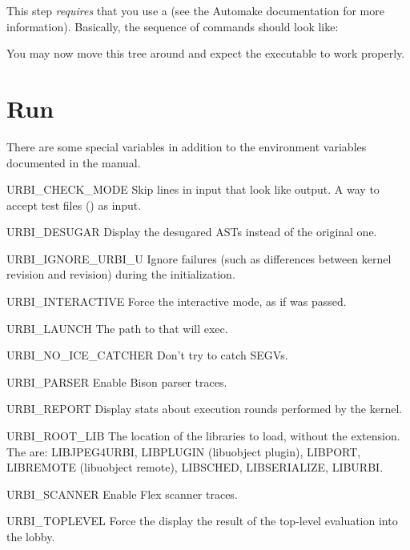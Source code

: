 This step \emph{requires} that you use a  (see the Automake
documentation for more information).  Basically, the sequence of commands
should look like:


You may now move this tree around and expect the executable to work
properly.

\section{Run}

There are some special variables in addition to the environment
variables documented in the manual.

\begin{envs}
\item[URBI\_CHECK\_MODE] Skip lines in input that look like \urbi output.  A
  way to accept test files () as input.

\item[URBI\_DESUGAR] Display the desugared ASTs instead of the
  original one.

\item[URBI\_IGNORE\_URBI\_U] Ignore failures (such as differences between
  kernel revision and  revision) during the initialization.

\item[URBI\_INTERACTIVE] Force the interactive mode, as if
   was passed.

\item[URBI\_LAUNCH] The path to  that
   will exec.

\item[URBI\_NO\_ICE\_CATCHER] Don't try to catch SEGVs.

\item[URBI\_PARSER] Enable Bison parser traces.

\item[URBI\_REPORT] Display stats about execution rounds performed by
  the kernel.

\item[URBI\_ROOT\_LIB\var{name}] The location of the libraries to load,
  without the extension.  The  are: LIBJPEG4URBI,
  LIBPLUGIN (libuobject plugin), LIBPORT, LIBREMOTE (libuobject remote),
  LIBSCHED, LIBSERIALIZE, LIBURBI.

\item[URBI\_SCANNER] Enable Flex scanner traces.

\item[URBI\_TOPLEVEL] Force the display the result of the top-level
  evaluation into the lobby.
\end{envs}

